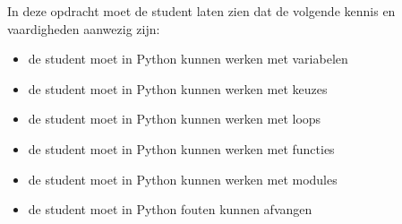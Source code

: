 In deze opdracht moet de student laten zien dat de volgende kennis en vaardigheden aanwezig zijn:
\begin{itemize}
\item de student moet in Python kunnen werken met variabelen
\item de student moet in Python kunnen werken met keuzes
\item de student moet in Python kunnen werken met loops
\item de student moet in Python kunnen werken met functies
\item de student moet in Python kunnen werken met modules
\item de student moet in Python fouten kunnen afvangen
\end{itemize}
